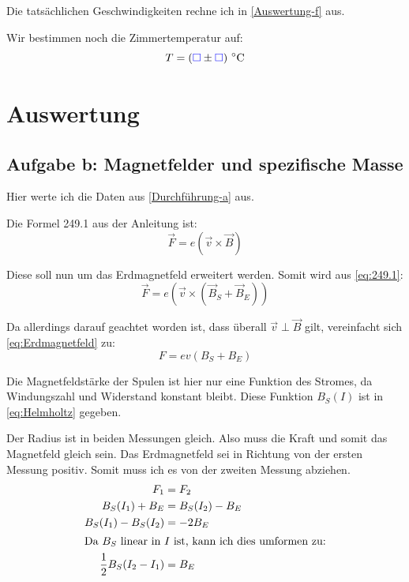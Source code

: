 \documentclass[11pt]{article}
\newcommand{\emesswert}{\left(\messwert \pm \messwert \right)}
\newcommand{\half}{\frac{1}{2}}
\newcommand{\messwert}{\textcolor{blue}{\square}}
\begin{document}
Die tatsächlichen Geschwindigkeiten rechne ich in \ref{Auswertung-f} aus.

Wir bestimmen noch die Zimmertemperatur auf:
\[ T = \unit[\emesswert]{^\circ C} \]


\section{Auswertung}

\subsection{Aufgabe b: Magnetfelder und spezifische Masse}

\label{Auswertung-b}

Hier werte ich die Daten aus \ref{Durchführung-a} aus.

Die Formel 249.1 aus der Anleitung ist:
\begin{equation}
	\label{eq:249.1}
	\vec F = e \left( \vec v \times \vec B \right)
\end{equation}

Diese soll nun um das Erdmagnetfeld erweitert werden. Somit wird aus
\eqref{eq:249.1}:
\begin{equation}
	\label{eq:Erdmagnetfeld}
	\vec F = e \left( \vec v \times \left( \vec B_S + \vec B_E \right) \right)
\end{equation}

Da allerdings darauf geachtet worden ist, dass überall $\vec v \perp \vec B$
gilt, vereinfacht sich \eqref{eq:Erdmagnetfeld} zu:
\begin{equation}
	\label{eq:magnetische-Kraft}
	F = e v (B_S + B_E)
\end{equation}

Die Magnetfeldstärke der Spulen ist hier nur eine Funktion des Stromes, da
Windungszahl und Widerstand konstant bleibt. Diese Funktion $B_S(I)$ ist in
\eqref{eq:Helmholtz} gegeben.

Der Radius ist in beiden Messungen gleich. Also muss die Kraft und somit das
Magnetfeld gleich sein. Das Erdmagnetfeld sei in Richtung von der ersten
Messung positiv. Somit muss ich es von der zweiten Messung abziehen.
%
\begin{align*}
	F_1 &= F_2 \\
	B_S(I_1) + B_E &= B_S(I_2) - B_E \\
	B_S(I_1) - B_S(I_2) &= - 2 B_E \\
	\intertext{Da $B_S$ linear in $I$ ist, kann ich dies umformen zu:}
	\half B_S(I_2 - I_1) &= B_E \\
\end{align*}
\end{document}
